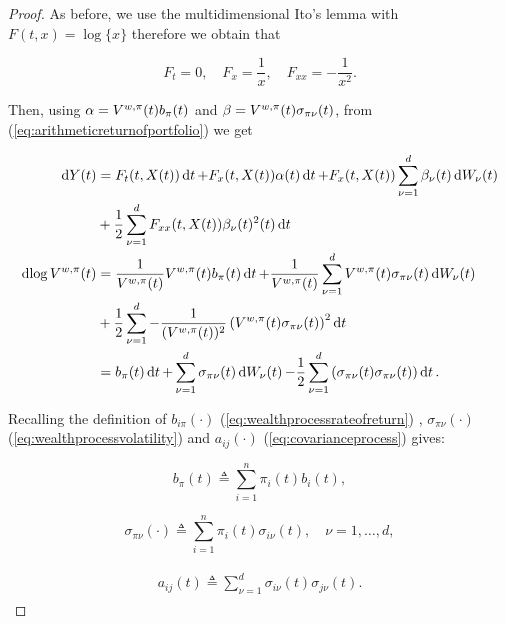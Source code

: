 \documentclass[british]{amsart} \usepackage{lmodern}
\numberwithin{equation}{section} \numberwithin{figure}{section}
\theoremstyle{plain} \newtheorem{thm}{\protect\theoremname}[section]
\theoremstyle{definition} \newtheorem{defn}[thm]{\protect\definitionname}
\theoremstyle{plain} \newtheorem{assumption}[thm]{\protect\assumptionname}
\theoremstyle{plain} \newtheorem{lem}[thm]{\protect\lemmaname}
\theoremstyle{plain} \newtheorem{prop}[thm]{\protect\propositionname}
\theoremstyle{remark} \newtheorem{rem}[thm]{\protect\remarkname}
\theoremstyle{plain} \newtheorem{cor}[thm]{\protect\corollaryname}
\renewcommand{\d}[1]{\mathop{\mathrm{d}{#1}}}
\newcommand{\defeq}{\mathop{\triangleq}} \newcommand{\almostsurely}{\text{a.s.}}
\newcommand{\V}{V^{w,\pi}}
\begin{document}
\begin{proof}

  As before, we use the multidimensional Ito's lemma with $F(t,x)=\log\{x\}$ therefore we obtain that

  \begin{equation}
    F_{t}=0, \quad F_{x}=\frac{1}{x}, \quad F_{xx}=-\frac{1}{x^2}.
  \end{equation}

  Then, using $\alpha=\Valpha$ and $\beta=\Vbeta$, from (\ref{eq:arithmeticreturnofportfolio}) we get

  \begin{gather*}
    \begin{split}
      \d{Y(t)} &= F_{t}(t, X(t))\d{t} + F_{x}(t,X(t)) \alpha(t)\d{t} 
         + F_{x}(t,X(t)) \sum_{\nu=1}^d \beta_{\nu}(t)\d{W_{\nu}(t)} \\
         &+ \frac{1}{2} \sum_{\nu=1}^d F_{xx}(t,X(t)) \beta_{\nu}(t)^{2}(t)\d{t} \\
     \d{\log{\V(t)}} 
         &= \VFx \Valpha \d{t} + \VFx \sum_{\nu=1}^d \Vbeta \d{W_{\nu}(t)} \\
            &+ \frac{1}{2} \sum_{\nu=1}^d \VFxx \left( \Vbeta \right)^{2} \d{t} \\
         &= b_{\pi}(t) \d{t} 
            + \sum_{\nu=1}^d \sigma_{\pi\nu}(t)  \d{W_{\nu}(t)} 
            - \frac{1}{2} \sum_{\nu=1}^d \left( \sigma_{\pi\nu}(t)\sigma_{\pi\nu}(t) \right) \d{t}. \\
    \end{split}
  \end{gather*}

  Recalling the definition of $b_{i\pi}(\cdot)$ (\ref{eq:wealthprocessrateofreturn})
  , $\sigma_{\pi\nu}(\cdot)$ (\ref{eq:wealthprocessvolatility}) and
  $a_{ij}(\cdot)$ (\ref{eq:covarianceprocess}) gives:

  \begin{equation*}
    b_{\pi}(t) \defeq \sum_{i=1}^{n} \pi_{i}(t) b_{i}(t),
  \end{equation*}

  \begin{equation*}
    \sigma_{\pi\nu}(\cdot) \defeq \sum_{i=1}^{n} \pi_{i}(t) \sigma_{i\nu}(t),
    \quad \nu=1,\dots,d,
  \end{equation*}

  \begin{gather*}
    \begin{split}
      a_{ij}(t) \defeq \sum_{\nu=1}^{d}\sigma_{i\nu}(t)\sigma_{j\nu}(t).
    \end{split}
  \end{gather*}


\end{proof}
\end{document}
